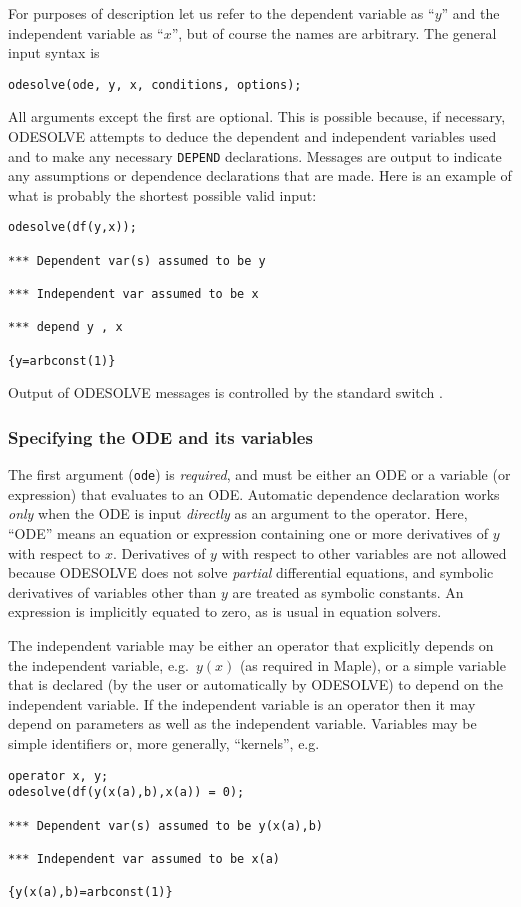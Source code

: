 For purposes of description let us refer to the dependent variable as
``$y$'' and the independent variable as ``$x$'', but of course the
names are arbitrary.  The general input syntax is
\begin{verbatim}
odesolve(ode, y, x, conditions, options);
\end{verbatim}
All arguments except the first are optional.  This is possible
because, if necessary, ODESOLVE attempts to deduce the dependent and
independent variables used and to make any necessary \texttt{DEPEND}
declarations.  Messages are output to indicate any assumptions or
dependence declarations that are made.  Here is an example of what is
probably the shortest possible valid input:
\begin{verbatim}
odesolve(df(y,x));

*** Dependent var(s) assumed to be y

*** Independent var assumed to be x

*** depend y , x

{y=arbconst(1)}
\end{verbatim}
Output of ODESOLVE messages is controlled by the standard \REDUCE{}
switch .


\subsubsection{Specifying the ODE and its variables}

The first argument (\texttt{ode}) is \emph{required}, and must be
either an ODE or a variable (or expression) that evaluates to an
ODE\@.  Automatic dependence declaration works \emph{only} when the
ODE is input \emph{directly} as an argument to the \odesolve{}
operator.  Here, ``ODE'' means an equation or expression containing
one or more derivatives of $y$ with respect to $x$.  Derivatives of
$y$ with respect to other variables are not allowed because ODESOLVE
does not solve \emph{partial} differential equations, and symbolic
derivatives of variables other than $y$ are treated as symbolic
constants.  An expression is implicitly equated to zero, as is usual
in equation solvers.

The independent variable may be either an operator that explicitly
depends on the independent variable, e.g.\ $y(x)$ (as required in
Maple), or a simple variable that is declared (by the user or
automatically by ODESOLVE) to depend on the independent variable.  If
the independent variable is an operator then it may depend on
parameters as well as the independent variable.  Variables may be
simple identifiers or, more generally, \REDUCE{} ``kernels'', e.g.
\begin{verbatim}
operator x, y;
odesolve(df(y(x(a),b),x(a)) = 0);

*** Dependent var(s) assumed to be y(x(a),b)

*** Independent var assumed to be x(a)

{y(x(a),b)=arbconst(1)}
\end{verbatim}

